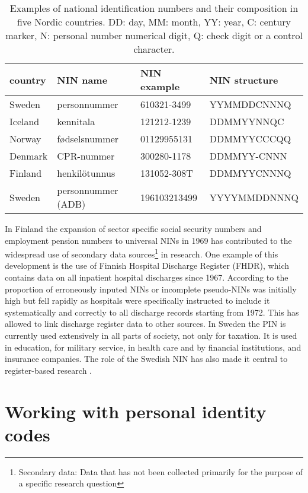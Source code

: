 \begin{table}[ht]
\centering
\begin{tabular}{llll}
\toprule
  country & NIN name & NIN example & NIN structure \\
  \hline
  Sweden & personnummer & 610321-3499 & YYMMDDCNNNQ \\
  Iceland & kennitala & 121212-1239 & DDMMYYNNQC \\
  Norway & fødselsnummer & 01129955131 & DDMMYYCCCQQ \\
  Denmark & CPR-nummer & 300280-1178 & DDMMYY-CNNN \\
  Finland & henkilötunnus & 131052-308T & DDMMYYCNNNQ \\
  \hline
  Sweden & personnummer (ADB) & 196103213499 & YYYYMMDDNNNQ \\
\bottomrule
\end{tabular}
\caption{Examples of national identification numbers and their composition in five Nordic countries. DD: day, MM: month, YY: year, C: century marker, N: personal number numerical digit, Q: check digit or a control character.}
\label{tab:nordiccomparison2}
\end{table}

In Finland the expansion of sector specific social security numbers and employment pension numbers to universal NINs in 1969 has contributed to the widespread use of secondary data sources\footnote{Secondary data: Data that has not been collected primarily for the purpose of a specific research question} in research. One example of this development is the use of Finnish Hospital Discharge Register (FHDR), which contains data on all inpatient hospital discharges since 1967. According to \citet{sund2012} the proportion of erroneously inputed NINs or incomplete pseudo-NINs was initially high but fell rapidly as hospitals were specifically instructed to include it systematically and correctly to all discharge records starting from 1972. This has allowed to link discharge register data to other sources. In Sweden the PIN is currently used extensively in all parts of society, not only for taxation. It is used in education, for military service, in health care and by financial institutions, and insurance companies. The role of the Swedish NIN has also made it central to register-based research \citep{scb2016}.

\section{Working with personal identity codes}

